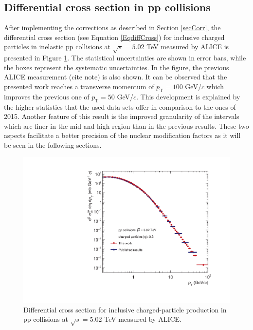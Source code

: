 \documentclass[12pt,a4paper]{report}
\begin{document}
\subsection{Differential cross section in pp collisions}
After implementing the corrections as described in Section \ref{secCorr}, the differential cross section (see Equation \ref{EqdiffCross}) for inclusive charged particles in inelastic pp collisions at $\sqrt{s}=5.02$ TeV measured by ALICE is presented in Figure \ref{diffCross}. The statistical uncertainties are shown in error bars, while the boxes represent the systematic uncertainties. In the figure, the previous ALICE measurement (cite note) is also shown. It can be observed that the presented work reaches a transverse momentum of $p_\text{T} = 100$ GeV/$c$ which improves the previous one of $p_\text{T} = 50$ GeV/$c$. This development is explained by the higher statistics that the used data sets offer in comparison to the ones of 2015. Another feature of this result is the improved granularity of the \pt intervals which are finer in the mid and high \pt region than in the previous results. These two aspects facilitate a better precision of the nuclear modification factors as it will be seen in the following sections. 
\begin{figure}[tb!]
\centering
\includegraphics[width=12cm]{Plots/diffCrosspp.pdf}  
\caption{Differential cross section for inclusive charged-particle production in pp collisions at $\sqrt{s}=5.02$ TeV measured by ALICE.}
\label{diffCross}
\end{figure}
\end{document}
